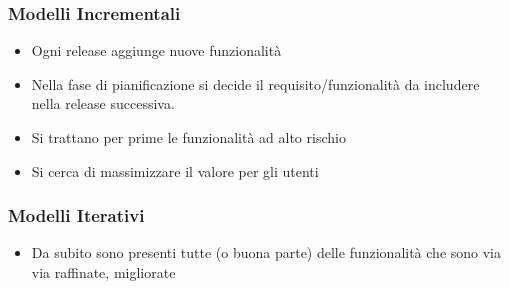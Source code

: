 \documentclass[12pt, a4paper]{report}
\begin{document}
\subsubsection{Modelli Incrementali}
\begin{itemize}
    \item Ogni release aggiunge nuove funzionalità
    \item Nella fase di pianificazione si decide il requisito/funzionalità da includere nella release successiva.
    \item Si trattano per prime le funzionalità ad alto rischio
    \item Si cerca di massimizzare il valore per gli utenti
\end{itemize}
\subsubsection{Modelli Iterativi}
\begin{itemize}
    \item Da subito sono presenti tutte (o buona parte) delle funzionalità che sono via via raffinate, migliorate
\end{itemize}
\end{document}
